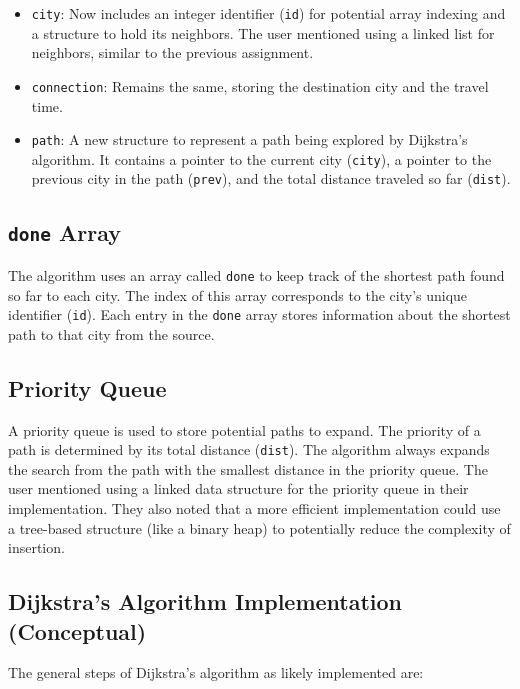\begin{itemize}
    \item \texttt{city}: Now includes an integer identifier (\texttt{id}) for potential array indexing and a structure to hold its neighbors. The user mentioned using a linked list for neighbors, similar to the previous assignment.
    \item \texttt{connection}: Remains the same, storing the destination city and the travel time.
    \item \texttt{path}: A new structure to represent a path being explored by Dijkstra's algorithm. It contains a pointer to the current city (\texttt{city}), a pointer to the previous city in the path (\texttt{prev}), and the total distance traveled so far (\texttt{dist}).
\end{itemize}

\subsection*{\texttt{done} Array}
The algorithm uses an array called \texttt{done} to keep track of the shortest path found so far to each city. The index of this array corresponds to the city's unique identifier (\texttt{id}). Each entry in the \texttt{done} array stores information about the shortest path to that city from the source.

\subsection*{Priority Queue}
A priority queue is used to store potential paths to expand. The priority of a path is determined by its total distance (\texttt{dist}). The algorithm always expands the search from the path with the smallest distance in the priority queue. The user mentioned using a linked data structure for the priority queue in their implementation. They also noted that a more efficient implementation could use a tree-based structure (like a binary heap) to potentially reduce the complexity of insertion.

\subsection*{Dijkstra's Algorithm Implementation (Conceptual)}
The general steps of Dijkstra's algorithm as likely implemented are:

